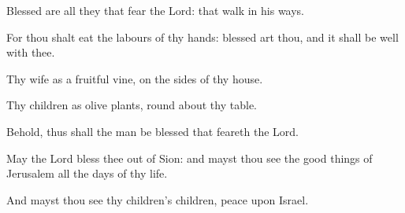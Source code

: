 ﻿\item Blessed are all they that fear the Lord: that walk in his ways.
\item For thou shalt eat the labours of thy hands: blessed art thou, and it shall be well with thee.
\item Thy wife as a fruitful vine, on the sides of thy house.
\item Thy children as olive plants, round about thy table.
\item Behold, thus shall the man be blessed that feareth the Lord.
\item May the Lord bless thee out of Sion: and mayst thou see the good things of Jerusalem all the days of thy life.
\item And mayst thou see thy children’s children, peace upon Israel.
